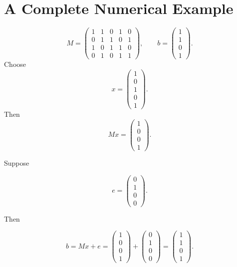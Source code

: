 \documentclass[11pt,a4paper]{article}
\begin{document}
\section{A Complete Numerical Example}
\begin{equation}
M=
\begin{pmatrix}
1&1&0&1&0\\
0&1&1&0&1\\
1&0&1&1&0\\
0&1&0&1&1
\end{pmatrix},
\qquad
b=
\begin{pmatrix}
1\\1\\0\\1
\end{pmatrix}.
\end{equation}
Choose
\begin{equation}
x=
\begin{pmatrix}
1\\0\\1\\0\\1
\end{pmatrix}.
\end{equation}
Then
\begin{equation}
Mx=
\begin{pmatrix}
1\\0\\0\\1
\end{pmatrix}.
\end{equation}

Suppose

\begin{equation}
e=
\begin{pmatrix}
0\\1\\0\\0
\end{pmatrix}.
\end{equation}

Then

\begin{equation}
b=Mx+e
=
\begin{pmatrix}
1\\0\\0\\1
\end{pmatrix}
+
\begin{pmatrix}
0\\1\\0\\0
\end{pmatrix}
=
\begin{pmatrix}
1\\1\\0\\1
\end{pmatrix}.
\end{equation}
\end{document}

